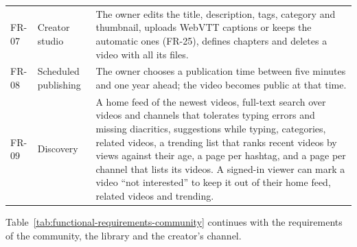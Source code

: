 \begin{table}[H]
\begin{tabularx}{\textwidth}{p{} p{} X}
FR-07 & Creator studio & The owner edits the title, description, tags, category and thumbnail, uploads WebVTT captions or keeps the automatic ones (FR-25), defines chapters and deletes a video with all its files. \\
FR-08 & Scheduled publishing & The owner chooses a publication time between five minutes and one year ahead; the video becomes public at that time. \\
FR-09 & Discovery & A home feed of the newest videos, full-text search over videos and channels that tolerates typing errors and missing diacritics, suggestions while typing, categories, related videos, a trending list that ranks recent videos by views against their age, a page per hashtag, and a page per channel that lists its videos. A signed-in viewer can mark a video ``not interested'' to keep it out of their home feed, related videos and trending. \\
\bottomrule
\end{tabularx}
\end{table}

Table~\ref{tab:functional-requirements-community} continues with the requirements of the community,
the library and the creator's channel.

